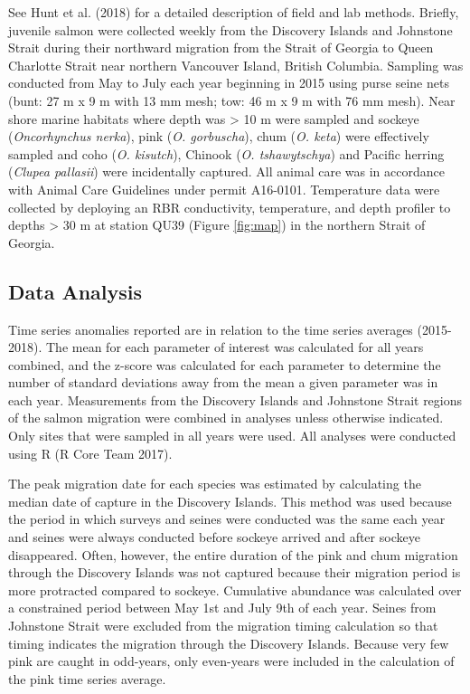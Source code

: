\documentclass[fleqn,10pt]{wlpeerj} %
\begin{document}
See Hunt et al. (2018) for a detailed description of field and lab
methods. Briefly, juvenile salmon were collected weekly from the
Discovery Islands and Johnstone Strait during their northward migration
from the Strait of Georgia to Queen Charlotte Strait near northern
Vancouver Island, British Columbia. Sampling was conducted from May to
July each year beginning in 2015 using purse seine nets (bunt: 27 m x 9
m with 13 mm mesh; tow: 46 m x 9 m with 76 mm mesh). Near shore marine
habitats where depth was \textgreater{} 10 m were sampled and sockeye
(\emph{Oncorhynchus nerka}), pink (\emph{O. gorbuscha}), chum (\emph{O.
keta}) were effectively sampled and coho (\emph{O. kisutch}), Chinook
(\emph{O. tshawytschya}) and Pacific herring (\emph{Clupea pallasii})
were incidentally captured. All animal care was in accordance with
Animal Care Guidelines under permit A16-0101. Temperature data were
collected by deploying an RBR conductivity, temperature, and depth
profiler to depths \textgreater{} 30 m at station QU39 (Figure
\ref{fig:map}) in the northern Strait of Georgia.

\subsection{Data Analysis}\label{data-analysis}

Time series anomalies reported are in relation to the time series
averages (2015-2018). The mean for each parameter of interest was
calculated for all years combined, and the z-score was calculated for
each parameter to determine the number of standard deviations away from
the mean a given parameter was in each year. Measurements from the
Discovery Islands and Johnstone Strait regions of the salmon migration
were combined in analyses unless otherwise indicated. Only sites that
were sampled in all years were used. All analyses were conducted using R
(R Core Team 2017).

The peak migration date for each species was estimated by calculating
the median date of capture in the Discovery Islands. This method was
used because the period in which surveys and seines were conducted was
the same each year and seines were always conducted before sockeye
arrived and after sockeye disappeared. Often, however, the entire
duration of the pink and chum migration through the Discovery Islands
was not captured because their migration period is more protracted
compared to sockeye. Cumulative abundance was calculated over a
constrained period between May 1st and July 9th of each year. Seines
from Johnstone Strait were excluded from the migration timing
calculation so that timing indicates the migration through the Discovery
Islands. Because very few pink are caught in odd-years, only even-years
were included in the calculation of the pink time series average.
\end{document}
